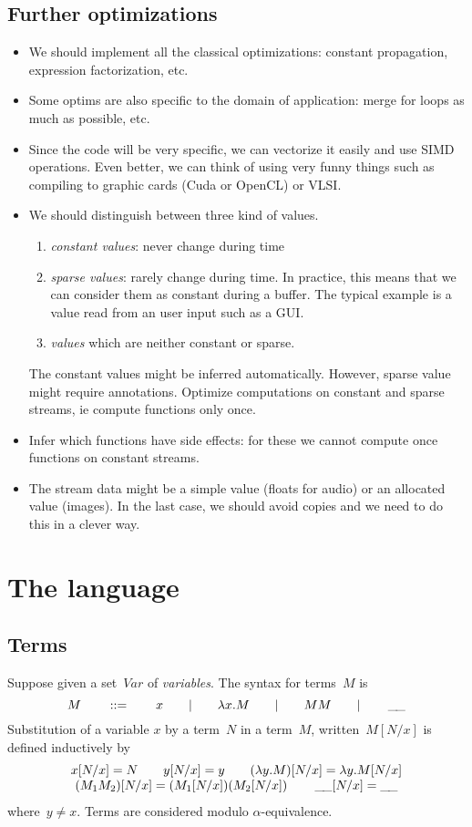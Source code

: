 \documentclass[a4paper,titlepage]{article}
\newcommand{\Var}{Var}
\newcommand{\hole}{\mathop{\_\hspace{-.3ex}\_}}
\begin{document}
\subsection{Further optimizations}
\begin{itemize}
\item We should implement all the classical optimizations: constant propagation,
  expression factorization, etc.
\item Some optims are also specific to the domain of application: merge for
  loops as much as possible, etc.
\item Since the code will be very specific, we can vectorize it easily and use
  SIMD operations. Even better, we can think of using very funny things such as
  compiling to graphic cards (Cuda or OpenCL) or VLSI.
\item We should distinguish between three kind of values.
  \begin{enumerate}
  \item \emph{constant values}: never change during time
  \item \emph{sparse values}: rarely change during time. In practice, this means
    that we can consider them as constant during a buffer. The typical example
    is a value read from an user input such as a GUI.
  \item \emph{values} which are neither constant or sparse.
  \end{enumerate}
  The constant values might be inferred automatically. However, sparse value
  might require annotations. Optimize computations on constant and sparse
  streams, ie compute functions only once.
\item Infer which functions have side effects: for these we cannot compute once
  functions on constant streams.
\item The stream data might be a simple value (floats for audio) or an allocated
  value (images). In the last case, we should avoid copies and we need to do
  this in a clever way.
\end{itemize}

\section{The language}
\subsection{Terms}
Suppose given a set~$\Var$ of \emph{variables}. The syntax for terms~$M$ is
\[
M
\qquad::=\qquad
x
\qquad|\qquad
\lambda x.M
\qquad|\qquad
MM
\qquad|\qquad
\hole
\]
Substitution of a variable $x$ by a term~$N$ in a term~$M$, written~$M[N/x]$ is
defined inductively by
\[
\begin{array}{c}
  x[N/x]=N
  \qquad
  y[N/x]=y
  \qquad
  (\lambda y.M)[N/x]=\lambda y.M[N/x]
  \\
  (M_1M_2)[N/x]=(M_1[N/x])(M_2[N/x])
  \qquad
  \hole[N/x]=\hole
\end{array}
\]
where~$y\neq x$. Terms are considered modulo $\alpha$-equivalence.
\end{document}
